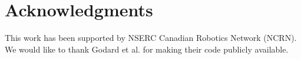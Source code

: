 \documentclass[letterpaper, 10 pt, conference]{ieeeconf}
\begin{document}
\section*{Acknowledgments}
This work has been supported by NSERC Canadian Robotics Network (NCRN). We would like to thank Godard et al.\cite{godard2017unsupervised} for making their code publicly available.



















\addtolength{\textheight}{-12cm} 
\end{document}
